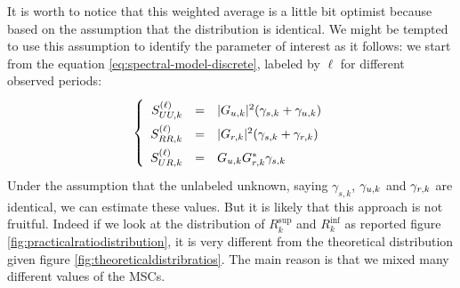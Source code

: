 It is worth to notice that this weighted average is a little bit optimist because based on the assumption that the distribution is identical.
We might be tempted to use this assumption to identify the parameter of interest as it follows: we start from the equation \eqref{eq:spectral-model-discrete}, labeled by $\ell$ for different observed periods:
\begin{eqnarray}
\label{eq:spectral-model-discrete-ell}
\left\{
\renewcommand\arraystretch{1.6}
\begin{array}{rcl}
S_{UU,k}^{(\ell)}&=&|G_{\ut,k}|^{2} (\gamma_{s,k}+\gamma_{\ut,k})
\\
S_{RR,k}^{(\ell)}&=&|G_{\rf,k}|^{2} (\gamma_{s,k}+\gamma_{\rf,k})
\\
S_{UR,k}^{(\ell)}&=&G_{\ut,k}G^{*}_{\rf,k}\gamma_{s,k}
\end{array}
\right.
\end{eqnarray}
Under the assumption that the unlabeled unknown, saying $\gamma_{s,k}$, $\gamma_{{u},k}$  and
$\gamma_{{r},k}$ are identical, we can estimate these values. But it is likely that this approach is not fruitful. Indeed if we look at the distribution of  $R_{k}^{\sup}$ and $R_{k}^{\inf}$  as reported figure \ref{fig:practicalratiodistribution}, it is very different from the theoretical distribution given figure \ref{fig:theoreticaldistribratios}. The  main reason is that we mixed many different values of the MSCs.



